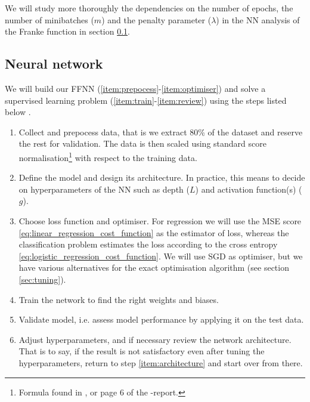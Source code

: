     We will study more thoroughly the dependencies on the number of epochs, the number of minibatches ($m$) and the penalty parameter ($\lambda$) in the NN analysis of the Franke function in section \ref{sec:analysis_NN}. 

    
\subsection{Neural network}\label{sec:analysis_NN}
    We will build our FFNN (\ref{item:prepocess}-\ref{item:optimiser}) and solve a supervised learning problem (\ref{item:train}-\ref{item:review}) using the steps listed below \citep{mhjensen}.

    \begin{enumerate}[label=(\roman*)]
        \item\label{item:prepocess} Collect and prepocess data, that is we extract 80\% of the dataset and reserve the rest for validation. The data is then scaled using standard score normalisation\footnote{Formula found in \cite{mhjensen}, or page 6 of the \projectOne-report.} with respect to the training data.
        \item\label{item:architecture} Define the model and design its architecture. In practice, this means to decide on hyperparameters of the NN such as depth ($L$) and activation function(s) ($g$).
        \item\label{item:optimiser} Choose loss function and optimiser. For regression we will use the MSE score \eqref{eq:linear_regression_cost_function} as the estimator of loss, whereas the classification problem estimates the loss according to the cross entropy \eqref{eq:logistic_regression_cost_function}. We will use SGD as optimiser, but we have various alternatives for the exact optimisation algorithm (see section \ref{sec:tuning}).
        \item\label{item:train} Train the network to find the right weights and biases.
        \item\label{item:assess} Validate model, i.e. assess model performance by applying it on the test data.
        \item\label{item:review} Adjust hyperparameters, and if necessary review the network architecture. That is to say, if the result is not satisfactory even after tuning the hyperparameters, return to step \ref{item:architecture} and start over from there. 
    \end{enumerate}

    

